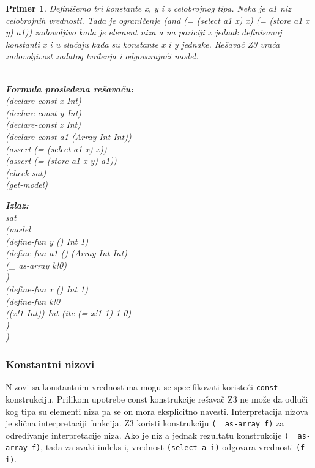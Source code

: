 \documentclass[12pt,oneside]{memoir}
\newcommand\tab[1][0.5cm]{\hspace*{#1}}
\newtheorem{primer}{Primer}
\begin{document}
\begin{primer} Definišemo tri konstante x, y i z celobrojnog tipa. Neka je a1 niz celobrojnih vrednosti. Tada je ograničenje (and (= (select a1 x) x) (= (store a1 x y) a1)) zadovoljivo kada je element niza a na poziciji x jednak definisanoj konstanti x i u slučaju kada su konstante x i y jednake.
Rešavač Z3 vraća zadovoljivost zadatog tvrđenja i odgovarajući model.
 \\ \\
\begin{minipage}[b]{0.45\textwidth}
\textbf{Formula prosleđena rešavaču:}
\\(declare-const x Int)
\\(declare-const y Int)
\\(declare-const z Int)
\\(declare-const a1 (Array Int Int))
\\(assert (= (select a1 x) x))
\\(assert (= (store a1 x y) a1))
\\(check-sat)
\\(get-model)
\end{minipage}
\hspace{1.3cm} 
\begin{minipage}[t]{0.5\textwidth}
\vspace{-5.3cm}
\textbf{Izlaz:}
\\sat
\\(model 
\\\tab(define-fun y () Int 1)
\\\tab(define-fun a1 () (Array Int Int)
\\\tab\tab(\_ as-array k!0)
\\\tab)
\\\tab(define-fun x () Int 1)
\\\tab(define-fun k!0 
\\\tab\tab((x!1 Int)) Int (ite (= x!1 1) 1 0)
\\\tab)
\\)
\end{minipage}
\end{primer} 
 

\subsubsection{Konstantni nizovi}

Nizovi sa konstantnim vrednostima mogu se specifikovati koristeći \texttt{const} konstrukciju. Prilikom upotrebe const konstrukcije rešavač Z3 ne može da odluči kog tipa su elementi niza pa se on mora eksplicitno navesti. Interpretacija nizova je slična interpretaciji funkcija. Z3 koristi konstrukciju \texttt{(\_ as-array f)} za određivanje interpretacije niza. Ako je niz a jednak rezultatu konstrukcije \texttt{(\_ as-array f)}, tada za svaki indeks i, vrednost \texttt{(select a i)} odgovara vrednosti \texttt{(f i)}. 
\end{document}
